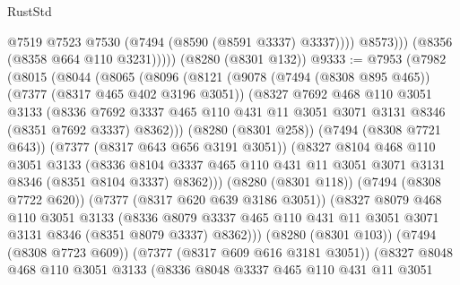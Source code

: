 \begin{lexlean}{RustStd}
\begin{coremodule}
                    @7519
                    @7523
                    @7530
                    (@7494 (@8590 (@8591 @3337) @3337))))
                @8573)))
          (@8356 (@8358 @664 @110 @3231)))))
    (@8280 (@8301 @132))
@9333 := @7953
    (@7982
      (@8015
        (@8044
          (@8065
            (@8096
              (@8121
                (@9078
                  (@7494 (@8308 @895 @465))
                  (@7377 (@8317 @465 @402 @3196 @3051))
                  (@8327
                    @7692
                    @468
                    @110
                    @3051
                    @3133
                    (@8336
                      @7692
                      @3337
                      @465
                      @110
                      @431
                      @11
                      @3051
                      @3071
                      @3131
                      @8346
                      (@8351 @7692 @3337)
                      @8362)))
                (@8280 (@8301 @258))
                (@7494 (@8308 @7721 @643))
                (@7377 (@8317 @643 @656 @3191 @3051))
                (@8327
                  @8104
                  @468
                  @110
                  @3051
                  @3133
                  (@8336
                    @8104
                    @3337
                    @465
                    @110
                    @431
                    @11
                    @3051
                    @3071
                    @3131
                    @8346
                    (@8351 @8104 @3337)
                    @8362)))
              (@8280 (@8301 @118))
              (@7494 (@8308 @7722 @620))
              (@7377 (@8317 @620 @639 @3186 @3051))
              (@8327
                @8079
                @468
                @110
                @3051
                @3133
                (@8336
                  @8079
                  @3337
                  @465
                  @110
                  @431
                  @11
                  @3051
                  @3071
                  @3131
                  @8346
                  (@8351 @8079 @3337)
                  @8362)))
            (@8280 (@8301 @103))
            (@7494 (@8308 @7723 @609))
            (@7377 (@8317 @609 @616 @3181 @3051))
            (@8327
              @8048
              @468
              @110
              @3051
              @3133
              (@8336
                @8048
                @3337
                @465
                @110
                @431
                @11
                @3051

\end{coremodule}
\end{lexlean}
